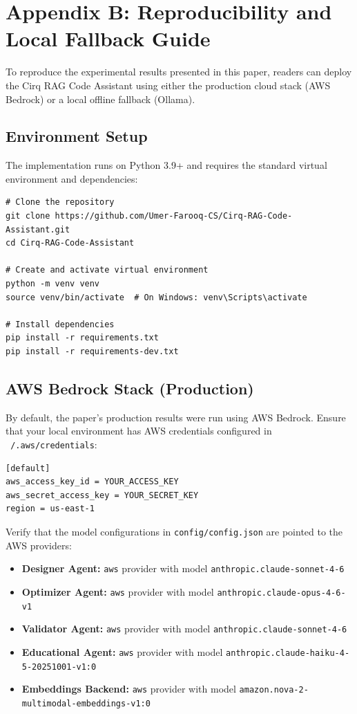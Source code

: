 \section*{Appendix B: Reproducibility and Local Fallback Guide}
\label{sec:appendix_b}

To reproduce the experimental results presented in this paper, readers can deploy the Cirq RAG Code Assistant using either the production cloud stack (AWS Bedrock) or a local offline fallback (Ollama). 

\subsection*{Environment Setup}
The implementation runs on Python 3.9+ and requires the standard virtual environment and dependencies:
\begin{verbatim}
# Clone the repository
git clone https://github.com/Umer-Farooq-CS/Cirq-RAG-Code-Assistant.git
cd Cirq-RAG-Code-Assistant

# Create and activate virtual environment
python -m venv venv
source venv/bin/activate  # On Windows: venv\Scripts\activate

# Install dependencies
pip install -r requirements.txt
pip install -r requirements-dev.txt
\end{verbatim}

\subsection*{AWS Bedrock Stack (Production)}
By default, the paper's production results were run using AWS Bedrock. Ensure that your local environment has AWS credentials configured in \texttt{~/.aws/credentials}:
\begin{verbatim}
[default]
aws_access_key_id = YOUR_ACCESS_KEY
aws_secret_access_key = YOUR_SECRET_KEY
region = us-east-1
\end{verbatim}
Verify that the model configurations in \texttt{config/config.json} are pointed to the AWS providers:
\begin{itemize}
    \item \textbf{Designer Agent:} \texttt{aws} provider with model \texttt{anthropic.claude-sonnet-4-6}
    \item \textbf{Optimizer Agent:} \texttt{aws} provider with model \texttt{anthropic.claude-opus-4-6-v1}
    \item \textbf{Validator Agent:} \texttt{aws} provider with model \texttt{anthropic.claude-sonnet-4-6}
    \item \textbf{Educational Agent:} \texttt{aws} provider with model \texttt{anthropic.claude-haiku-4-5-20251001-v1:0}
    \item \textbf{Embeddings Backend:} \texttt{aws} provider with model \texttt{amazon.nova-2-multimodal-embeddings-v1:0}
\end{itemize}

